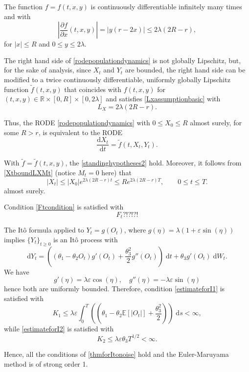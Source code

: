 \documentclass[reqno,12pt]{amsart}
\theoremstyle{plain}%
\theoremstyle{definition}
\begin{document}
The function $f=f(t, x, y)$ is continuously differentiable infinitely many times and with
\[
    \left|\frac{\partial f}{\partial x}(t, x, y)\right| = |y(r - 2x)|\leq 2\lambda (2R - r),
\]
for $|x| \leq R$ and $0 \leq y \leq 2\lambda$.

The right hand side of \eqref{rodepopulationdynamics} is not globally Lipschitz, but, for the sake of analysis, since $X_t$ and $Y_t$ are bounded, the right hand side can be modified to a twice continuously differentiable, uniformly globally Lipschitz function $\tilde f(t, x, y)$ that coincides with $f(t, x, y)$ for $(t, x, y) \in \mathbb{R}\times [0, R]\times [0, 2\lambda]$ and satisfies \eqref{Lxassumptionbasic} with
\[
    L_X = 2\lambda (2R - r).
\]

Thus, the RODE \eqref{rodepopulationdynamics} with $0\leq X_0 \leq R$ almost surely, for some $R > r$, is equivalent to the RODE
\begin{equation}
    \label{rodepopulationdynamicstruncated}
    \frac{\mathrm{d}X_t}{\mathrm{d}t} = \tilde f(t, X_t, Y_t).
\end{equation}

With $\tilde f=\tilde f(t, x, y)$, the \cref{standinghypotheses2} hold. Moreover, it follows from \eqref{XtboundLXMt} (notice $M_t = 0$ here) that
\[
    |X_t| \leq |X_0|e^{2\lambda (2R - r)t} \leq R e^{2\lambda (2R - r)T}, \qquad 0 \leq t \leq T.
\]
almost surely. 

Condition \eqref{Ftcondition} is satisfied with
\[
    F_t ?!?!?!
\]

The It\^o formula applied to $Y_t = g(O_t)$, where $g(\eta) = \lambda (1 + \varepsilon \sin(\eta))$ implies $\{Y_t\}_{t\geq 0}$ is an It\^o process with
\[
    \mathrm{d}Y_t = \left((\theta_1 - \theta_2 O_t)g'(O_t) + \frac{\theta_3^2}{2}g''(O_t)\right)\;\mathrm{d}t + \theta_3 g'(O_t)\;\mathrm{d}W_t.
\]
We have
\[
    g'(\eta) = \lambda \varepsilon \cos(\eta), \quad g''(\eta) = -\lambda\varepsilon\sin(\eta)
\]
hence both are uniformly bounded. Therefore, condition \eqref{estimateforI1} is satisfied with
\[
    K_1 \leq \lambda\varepsilon \int_0^T \left( (\theta_1 - \theta_2 \mathbb{E}[|O_t|] + \frac{\theta_3^2}{2})\right) \;\mathrm{d}s < \infty,
\]
while \eqref{estimateforI2} is satisfied with
\[
    K_2 \leq \lambda\varepsilon\theta_3 T^{1/2} < \infty.
\]

Hence, all the conditions of \cref{thmforItonoise} hold and the Euler-Maruyama method is of strong order 1.
\end{document}
